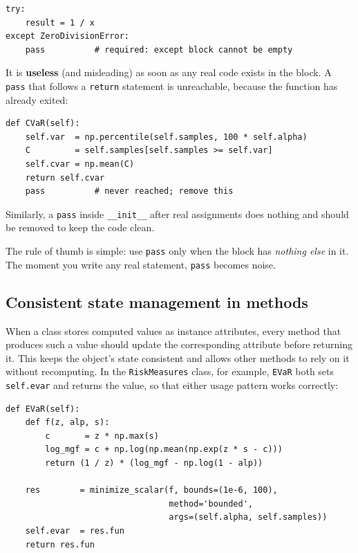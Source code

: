 \documentclass[11pt]{article}
\begin{document}
\begin{lstlisting}[style=python]
try:
    result = 1 / x
except ZeroDivisionError:
    pass          # required: except block cannot be empty
\end{lstlisting}

It is \textbf{useless} (and misleading) as soon as any real code exists in the
block. A \texttt{pass} that follows a \texttt{return} statement is unreachable,
because the function has already exited:

\begin{lstlisting}[style=python]
def CVaR(self):
    self.var  = np.percentile(self.samples, 100 * self.alpha)
    C         = self.samples[self.samples >= self.var]
    self.cvar = np.mean(C)
    return self.cvar
    pass          # never reached; remove this
\end{lstlisting}

Similarly, a \texttt{pass} inside \texttt{\_\_init\_\_} after real assignments does
nothing and should be removed to keep the code clean.

The rule of thumb is simple: use \texttt{pass} only when the block has
\textit{nothing else} in it. The moment you write any real statement, \texttt{pass}
becomes noise.

\subsection{Consistent state management in methods}

When a class stores computed values as instance attributes, every method that
produces such a value should update the corresponding attribute before returning it.
This keeps the object's state consistent and allows other methods to rely on it
without recomputing. In the \texttt{RiskMeasures} class, for example, \texttt{EVaR}
both sets \texttt{self.evar} and returns the value, so that either usage pattern
works correctly:

\begin{lstlisting}[style=python]
def EVaR(self):
    def f(z, alp, s):
        c       = z * np.max(s)
        log_mgf = c + np.log(np.mean(np.exp(z * s - c)))
        return (1 / z) * (log_mgf - np.log(1 - alp))

    res        = minimize_scalar(f, bounds=(1e-6, 100),
                                 method='bounded',
                                 args=(self.alpha, self.samples))
    self.evar  = res.fun
    return res.fun
\end{lstlisting}
\end{document}
